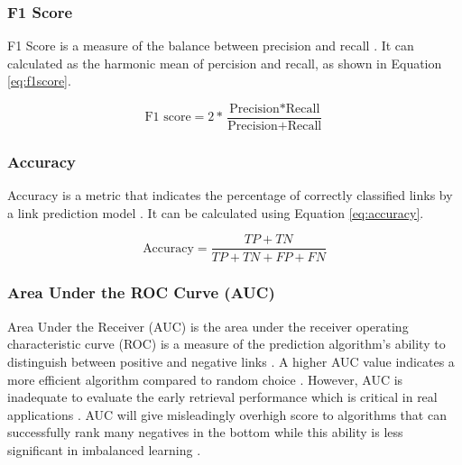 \subsubsection{F1 Score}

F1 Score is a measure of the balance between precision and recall \cite{arrar2023comprehensive}. It can calculated as the harmonic mean of percision and recall, as shown in Equation \ref{eq:f1score}.

\begin{equation}
\label{eq:f1score}
  \text{F1 score} = 2 * \frac{\text{Precision} * \text{Recall}}{\text{Precision} + \text{Recall}}
\end{equation}


\subsubsection{Accuracy}

Accuracy is a metric that indicates the percentage of correctly classified links by a link prediction model \cite{arrar2023comprehensive}. It can be calculated using Equation \ref{eq:accuracy}.

\begin{equation}
\label{eq:accuracy}
  \text{Accuracy} = \frac{TP + TN}{TP + TN + FP + FN}
\end{equation}


\subsubsection{Area Under the ROC Curve (AUC)}

Area Under the Receiver (AUC) \cite{hanley1982meaning} is the area under the receiver operating characteristic curve (ROC) is a measure of the prediction algorithm's ability to distinguish between positive and negative links \cite{arrar2023comprehensive}. A higher AUC value indicates a more efficient algorithm compared to random choice \cite{mumin2022efficient}. However, AUC is inadequate to evaluate the early retrieval performance which is critical in real applications \cite{zhou2021progresses}. AUC will give misleadingly overhigh score to algorithms that can successfully rank many negatives in the bottom while this ability is less significant in imbalanced learning \cite{yang2015evaluating, lichtnwalter2012link}.
